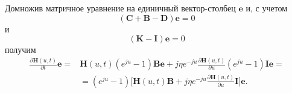Домножив матричное уравнение на единичный вектор-столбец $\boldsymbol{e}$ и,
с учетом $$(\boldsymbol{C} + \boldsymbol{B} - \boldsymbol{D}) \boldsymbol{e} = 0$$ 
и $$(\boldsymbol{K} - \boldsymbol{I}) \boldsymbol{e} = 0$$ получим
\begin{equation} \label{vtoroe__uravnenie}
\begin{aligned} 
    \frac{\partial \boldsymbol{H}(u,t)}{\partial t}\boldsymbol{e}=
        &\boldsymbol{H}(u,t)(e^{ju}-1)\boldsymbol{B}\boldsymbol{e}
            +j\eta e^{-ju}\frac{\partial \boldsymbol{H}(u,t)}{\partial u}(e^{ju}-1)\boldsymbol{I}\boldsymbol{e}=\\
        &=(e^{ju}-1)\Bigg[\boldsymbol{H}(u,t)\boldsymbol{B}
            +j\eta e^{-ju}\frac{\partial \boldsymbol{H}(u,t)}{\partial u}\boldsymbol{I} \Bigg]\boldsymbol{e}.
\end{aligned}
\end{equation}
\begin{comment}
Благодаря утверждению \eqref{summa_na_edinich_nol} можем преобразовать  \eqref{uravnenie_isaeva}:
\[\pdv{\boldsymbol{H}(u,t)}{t}\overline{\boldsymbol{E}}=\boldsymbol{H}(u,t)(e^{ju}-1)\]
\begin{align*}
\pdv{\boldsymbol{H}(u,t)}{t}\boldsymbol{e}=&\boldsymbol{H}(u,t)(e^{ju}-1)\boldsymbol{B}\boldsymbol{e}+j\sigma e^{-ju}\frac{\partial \boldsymbol{H}(u,t)}{\partial u}(e^{ju}-1)\boldsymbol{I_{0}}\boldsymbol{e}=\\
&=(e^{ju}-1)\{\boldsymbol{H}(u,t)\boldsymbol{B}\boldsymbol{e}+j\sigma e^{-ju}\frac{\partial \boldsymbol{H}(u,t)}{\partial u}\boldsymbol{I_{0}} \boldsymbol{e}\}
\end{align*} 
\end{comment}
